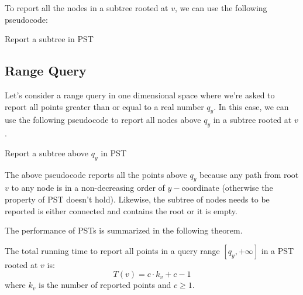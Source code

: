 To report all the nodes in a subtree rooted at $v$, we can use the following pseudocode:
\begin{algorithm}[H]
\caption{Report a subtree in PST}\label{Report_subtree1}
\begin{algorithmic}[1]
    \State {}
    \State {}
    \State {}
\EndIf
\EndFunction
\end{algorithmic}
\end{algorithm}

\subsection{Range Query}
Let's consider a range query in one dimensional space where we're asked to report all points greater than or equal to a real number $q_y$. In this case, we can use the following pseudocode to report all nodes above $q_y$ in a subtree rooted at $v$.
\begin{algorithm}[H]
\caption{Report a subtree above $q_y$ in PST}\label{Report_subtree2}
\begin{algorithmic}[1]
        \State {}
        \State {}
        \State {}
    \EndIf
\EndIf
\EndFunction
\end{algorithmic}
\end{algorithm}
The above pseudocode reports all the points above $q_y$ because any path from root $v$ to any node is in a non-decreasing order of $y-$coordinate (otherwise the property of PST doesn't hold). Likewise, the subtree of nodes needs to be reported is either connected and contains the root or it is empty.

The performance of PSTs is summarized in the following theorem.
\begin{theorem}\label{theorem1:RQ}
The total running time to report all points in a query range $[q_y, +\infty]$ in a PST rooted at $v$ is:
\begin{equation*}
    T(v) = c\cdot k_v + c - 1
\end{equation*}
where $k_v$ is the number of reported points and $c \geq 1$.
\end{theorem}

